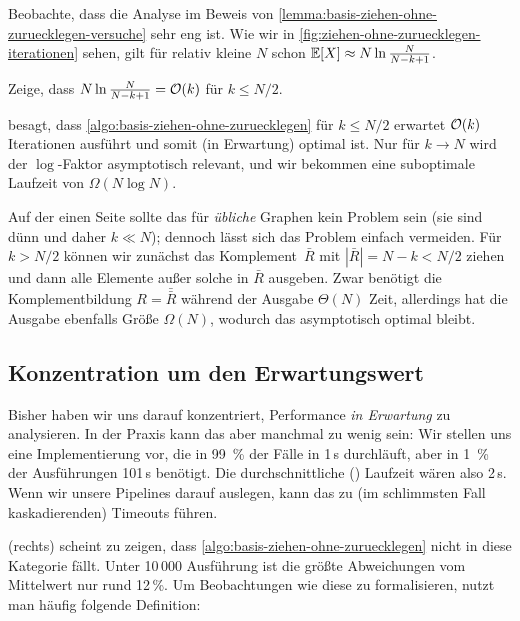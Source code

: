 Beobachte, dass die Analyse im Beweis von \cref{lemma:basis-ziehen-ohne-zuruecklegen-versuche} sehr eng ist.
Wie wir in \cref{fig:ziehen-ohne-zuruecklegen-iterationen} sehen, gilt für relativ kleine $N$ schon $\mathbb{E}\!\left[X\right] \approx N \ln \frac{N}{N - k + 1}$.

\begin{exercise}
    Zeige, dass $N \ln \frac{N}{N - k + 1} = \mathcal{O}\!\left(k\right)$ für $k \le N / 2$.
\end{exercise}

\bigskip

 besagt, dass \cref{algo:basis-ziehen-ohne-zuruecklegen} für $k \le N / 2$ erwartet $\mathcal{O}\!\left(k\right)$ Iterationen ausführt und somit (in Erwartung) optimal ist.
Nur für $k \to N$ wird der $\log$-Faktor asymptotisch relevant, und wir bekommen eine suboptimale Laufzeit von $\Omega(N \log N)$.

Auf  der einen Seite sollte das für \emph{übliche} Graphen kein Problem sein (sie sind dünn und daher $k \ll N$); dennoch lässt sich das Problem einfach vermeiden.
Für $k > N / 2$ können wir zunächst das Komplement~$\bar R$ mit  $| \bar R | = N - k < N/2$ ziehen und dann alle Elemente außer solche in $\bar R$ ausgeben.
Zwar benötigt die Komplementbildung $R = \bar{\bar R}$ während der Ausgabe $\Theta(N)$ Zeit, allerdings hat die Ausgabe ebenfalls Größe $\Omega(N)$, wodurch das asymptotisch optimal bleibt.

\subsection{Konzentration um den Erwartungswert}
Bisher haben wir uns darauf konzentriert, Performance \emph{in Erwartung} zu analysieren.
In der Praxis kann das aber manchmal zu wenig sein:
Wir stellen uns eine Implementierung vor, die in 99~\% der Fälle in 1\,s durchläuft, aber in 1~\% der Ausführungen 101\,s benötigt.
Die durchschnittliche () Laufzeit wären also 2\,s.
Wenn wir unsere Pipelines darauf auslegen, kann das zu (im schlimmsten Fall kaskadierenden) Timeouts führen.

 (rechts) scheint zu zeigen, dass \cref{algo:basis-ziehen-ohne-zuruecklegen} nicht in diese Kategorie fällt.
Unter 10\,000 Ausführung ist die größte Abweichungen vom Mittelwert nur rund 12\,\%.
Um Beobachtungen wie diese zu formalisieren, nutzt man häufig folgende Definition:

